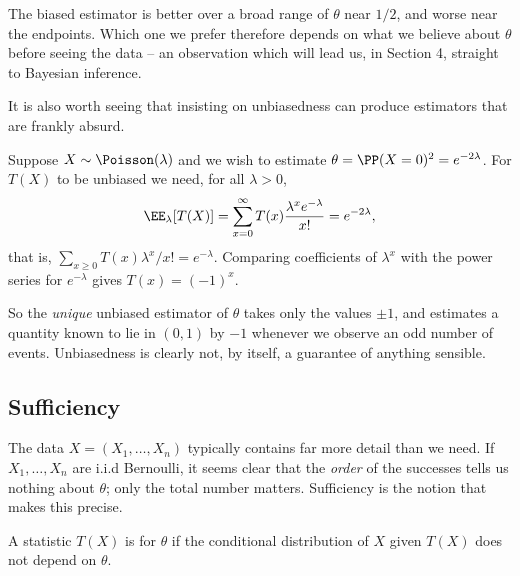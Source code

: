 \begin{example}
\begin{center}
  \end{center}

  The biased estimator is better over a broad range of $\theta$ near $1/2$, and worse near the endpoints. Which one we prefer therefore depends on what we believe about $\theta$ before seeing the data -- an observation which will lead us, in Section 4, straight to Bayesian inference.
\end{example}

It is also worth seeing that insisting on unbiasedness can produce estimators that are frankly absurd.

\begin{example}
  Suppose $X \sim \Poisson(\lambda)$ and we wish to estimate $\theta = \PP(X = 0)^2 = e^{-2\lambda}$. For $T(X)$ to be unbiased we need, for all $\lambda > 0$,
  $$
  \EE_\lambda[T(X)] = \sum_{x = 0}^{\infty} T(x)\frac{\lambda^x e^{-\lambda}}{x!} = e^{-2\lambda},
  $$
  that is, $\sum_{x \geq 0}T(x)\lambda^x/x! = e^{-\lambda}$. Comparing coefficients of $\lambda^x$ with the power series for $e^{-\lambda}$ gives $T(x) = (-1)^x$.

  So the \emph{unique} unbiased estimator of $\theta$ takes only the values $\pm 1$, and estimates a quantity known to lie in $(0,1)$ by $-1$ whenever we observe an odd number of events. Unbiasedness is clearly not, by itself, a guarantee of anything sensible.
\end{example}

\subsection{Sufficiency}

The data $X = (X_1, \dots, X_n)$ typically contains far more detail than we need. If $X_1, \dots, X_n$ are i.i.d Bernoulli, it seems clear that the \emph{order} of the successes tells us nothing about $\theta$; only the total number matters. Sufficiency is the notion that makes this precise.

\begin{definition}
  A statistic $T(X)$ is  for $\theta$ if the conditional distribution of $X$ given $T(X)$ does not depend on $\theta$.
\end{definition}

